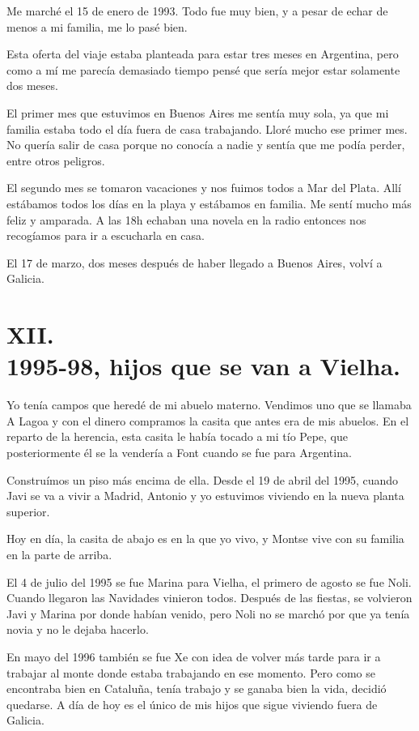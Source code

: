 \documentclass[12pt,a5paper]{book}
\begin{document}
Me marché el 15 de enero de 1993. Todo fue muy bien, y a pesar de echar de menos a mi familia, me lo pasé bien.
 
Esta oferta del viaje estaba planteada para estar tres meses en Argentina, pero como a mí me parecía demasiado tiempo pensé que sería mejor estar solamente dos meses.

El primer mes que estuvimos en Buenos Aires me sentía muy sola, ya que mi familia estaba todo el día fuera de casa trabajando. Lloré mucho ese primer mes. No quería salir de casa porque no conocía a nadie y sentía que me podía perder, entre otros peligros.

El segundo mes se tomaron vacaciones y nos fuimos todos a Mar del Plata. Allí estábamos todos los días en la playa y estábamos en familia. Me sentí mucho más feliz y amparada. A las 18h echaban una novela en la radio entonces nos recogíamos para ir a escucharla en casa.

El 17 de marzo, dos meses después de haber llegado a Buenos Aires, volví a Galicia.



\section*{XII.\\1995-98, hijos que se van a Vielha.}

Yo tenía campos que heredé de mi abuelo materno. Vendimos uno que se llamaba A Lagoa y con el dinero compramos la casita que antes era de mis abuelos. En el reparto de la herencia, esta casita le había tocado a mi tío Pepe, que posteriormente él se la vendería a Font cuando se fue para Argentina.

Construímos un piso más encima de ella. Desde el 19 de abril del 1995, cuando Javi se va a vivir a Madrid, Antonio y yo estuvimos viviendo en la nueva planta superior.

Hoy en día, la casita de abajo es en la que yo vivo, y Montse vive con su familia en la parte de arriba.

El 4 de julio del 1995 se fue Marina para Vielha, el primero de agosto se fue Noli. Cuando llegaron las Navidades vinieron todos. Después de las fiestas, se volvieron Javi y Marina por donde habían venido, pero Noli no se marchó por que ya tenía novia y no le dejaba hacerlo. 

En mayo del 1996 también se fue Xe con idea de volver más tarde para ir a trabajar al monte donde estaba trabajando en ese momento. Pero como se encontraba bien en Cataluña, tenía trabajo y se ganaba bien la vida, decidió quedarse. A día de hoy es el único de mis hijos que sigue viviendo fuera de Galicia.
\end{document}
